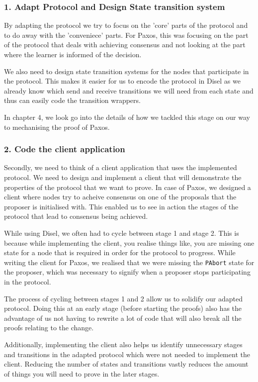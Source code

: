 \subsubsection{1. Adapt Protocol and Design State transition system}
By adapting the protocol we try to focus on the 'core' parts of the protocol
and to do away with the 'conveniece' parts. For Paxos, this was focusing on the
part of the protocol that deals with achieving consensus and not looking at the
part where the learner is informed of the decision.

We also need to design state transition systems for the nodes that participate
in the protocol. This makes it easier for us to encode the protocol in Disel as
we already know which send and receive transitions we will need from each state
and thus can easily code the transition wrappers.

In chapter 4, we look go into the details of how we tackled this stage on our way
to mechanising the proof of Paxos.

\subsubsection{2. Code the client application}
Secondly, we need to think of a client application that uses the implemented protocol.
We need to design and implement a client that will demonstrate the properties of the
protocol that we want to prove. In case of Paxos, we designed a client
where nodes try to acheive consensus on one of the proposals that the proposer
is initialised with. This enabled us to see in action the stages of the protocol
that lead to consensus being achieved.

While using Disel, we often had to cycle between stage 1 and stage 2.
This is because while implementing the client, you realise things like, you are
missing one state for a node that is required in order for the protocol to progress.
While writing the client for Paxos, we realised that we were missing the \texttt{PAbort}
state for the proposer, which was necessary to signify when a proposer stops
participating in the protocol.

The process of cycling between stages 1 and 2 allow us to solidify our adapted
protocol. Doing this at an early stage (before starting the proofs)
also has the advantage of us not having to rewrite a lot of code that will also
break all the proofs relating to the change.

Additionally, implementing the client also helps us identify unnecessary stages
and transitions in the adapted protocol which were not needed to implement the
client. Reducing the number of states and transitions vastly reduces the amount
of things you will need to prove in the later stages.

